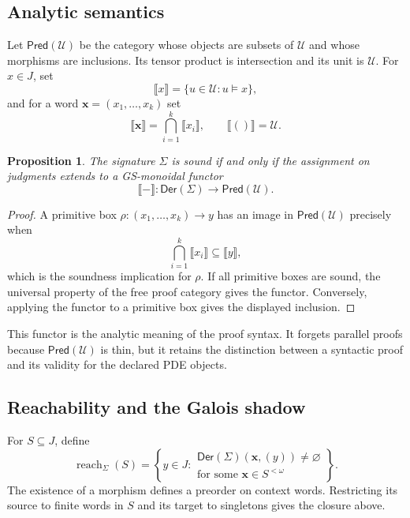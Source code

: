 \documentclass[10pt,journal,a4paper]{IEEEtran}
\newtheorem{proposition}[theorem]{Proposition}
\theoremstyle{definition}
\begin{document}
\subsection{Analytic semantics}

Let $\mathsf{Pred}(\mathcal U)$ be the category whose objects are subsets of $\mathcal U$ and whose morphisms are inclusions. Its tensor product is intersection and its unit is $\mathcal U$. For $x\in J$, set
\[
  \llbracket x\rrbracket
  =
  \{u\in\mathcal U:u\models x\},
\]
and for a word $\mathbf x=(x_1,\ldots,x_k)$ set
\[
  \llbracket\mathbf x\rrbracket
  =
  \bigcap_{i=1}^k\llbracket x_i\rrbracket,
  \qquad
  \llbracket()\rrbracket=\mathcal U.
\]

\begin{proposition}\label{prop:analytic-semantics}
The signature $\Sigma$ is sound if and only if the assignment on judgments extends to a GS-monoidal functor
\[
  \llbracket-\rrbracket:
  \mathsf{Der}(\Sigma)
  \longrightarrow
  \mathsf{Pred}(\mathcal U).
\]
\end{proposition}

\begin{proof}
A primitive box $\rho:(x_1,\ldots,x_k)\to y$ has an image in $\mathsf{Pred}(\mathcal U)$ precisely when
\[
  \bigcap_{i=1}^k\llbracket x_i\rrbracket
  \subseteq
  \llbracket y\rrbracket,
\]
which is the soundness implication for $\rho$. If all primitive boxes are sound, the universal property of the free proof category gives the functor. Conversely, applying the functor to a primitive box gives the displayed inclusion.
\end{proof}

This functor is the analytic meaning of the proof syntax. It forgets parallel proofs because $\mathsf{Pred}(\mathcal U)$ is thin, but it retains the distinction between a syntactic proof and its validity for the declared PDE objects.

\subsection{Reachability and the Galois shadow}

For $S\subseteq J$, define
\[
  \operatorname{reach}_\Sigma(S)
  =
  \left\{
  y\in J:
  \begin{array}{l}
    \mathsf{Der}(\Sigma)(\mathbf x,(y))\neq\varnothing\\
    \text{for some }\mathbf x\in S^{<\omega}
  \end{array}
  \right\}.
\]
The existence of a morphism defines a preorder on context words. Restricting its source to finite words in $S$ and its target to singletons gives the closure above.
\end{document}
